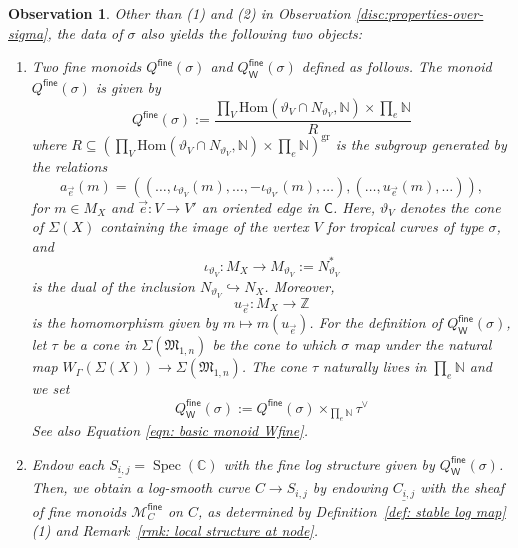 \documentclass{article}
\def\N{{\mathbb{N}}}
\newtheorem{observation}[definition]{Observation}
\newcommand{\gr}{\mathrm{gr}}
\newcommand{\fine}{\mathsf{fine}}
\newcommand{\W}{\mathsf{W}}
\begin{document}
\begin{observation}\label{obs: further properties from sigma}
    Other than (1) and (2) in Observation \ref{disc:properties-over-sigma}, the data of $\sigma$ also yields the following two objects: 
    \begin{enumerate}[start=3, label=(\arabic*)]
        \item Two fine monoids $Q^{\fine}(\sigma)$ and $Q_{\mathsf{W}}^{\fine}(\sigma)$ defined as follows. The monoid  $Q^{\fine}(\sigma)$ is given by
        \begin{equation}\label{eqn: monoid Qfinesigma}
        Q^{\fine}(\sigma) := \frac{\prod_V \mathrm{Hom}(\vartheta_V \cap N_{\vartheta_V}, \mathbb{N}) \times \prod_e \mathbb{N}}{R}
        \end{equation}
        where $R \subseteq \left(\prod_V \mathrm{Hom}(\vartheta_V \cap N_{\vartheta_V}, \mathbb{N}) \times \prod_e \mathbb{N}\right)^{\gr}$ is the subgroup generated by the relations
        \begin{equation}\label{eqn: relations from tropical curve}
        a_{\vec{e}}(m) = \left((\ldots, \iota_{\vartheta_V}(m), \ldots, -\iota_{\vartheta_{V'}}(m), \ldots), (\ldots, u_{\vec{e}}(m), \ldots)\right),
        \end{equation}
        for $m \in M_X$ and $\vec{e}: V \to V'$ an oriented edge in $\mathsf{C}$. Here, $\vartheta_V$ denotes the cone of $\Sigma(X)$ containing the image of the vertex $V$ for tropical curves of type $\sigma$, and
     \[
        \iota_{\vartheta_V} : M_X \longrightarrow M_{\vartheta_V} := N_{\vartheta_V}^{*}
    \]
    is the dual of the inclusion $N_{\vartheta_V} \hookrightarrow N_X$. Moreover,
    \[
        u_{\vec e} : M_X \longrightarrow \mathbb Z
        \]
    is the homomorphism given by $m \mapsto m(u_{\vec e})$. For the definition of $Q_\W^{\fine}(\sigma)$, let $\tau $ be a cone in $\Sigma(\mathfrak{M}_{1,n})$ be the cone to which $\sigma$ map under the natural map $W_{\Gamma}(\Sigma(X)) \to \Sigma(\mathfrak{M}_{1,n})$. The cone $\tau$ naturally lives in $\prod_e \N$ and we set  
        \begin{equation}\label{eqn: monoid QWfinesigma}
        Q_\W^{\fine}(\sigma):= Q^{\fine}(\sigma) \times_{\prod_e \N} \tau^\vee
        \end{equation}
        See also Equation \eqref{eqn: basic monoid Wfine}.
        \item Endow each $\underline{S_{i,j}} = \operatorname{Spec}(\mathbb{C})$ with the fine log structure given by $Q_{\mathsf{W}}^{\mathsf{fine}}(\sigma)$. Then, we obtain a log-smooth curve $C \to S_{i,j}$ by endowing $\underline{C_{i,j}}$ with the sheaf of fine monoids $\mathcal{M}_C^{\fine}$ on $C$, as determined by Definition~\ref{def: stable log map}(1) and Remark~\ref{rmk: local structure at node}.
    \end{enumerate}
\end{observation}
\end{document}
